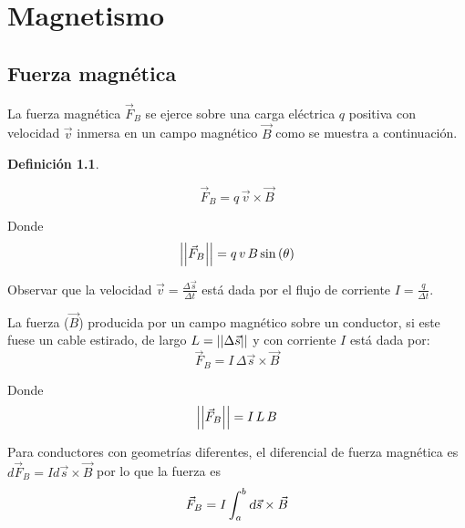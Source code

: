 \documentclass[a5paper,12pt,twoside]{book}
\newtheorem{defn}{{Definición}}[chapter]
\begin{document}
\chapter{Magnetismo}


\section{Fuerza magnética}

La fuerza magnética $\Vec{F}_B$ se ejerce sobre una carga eléctrica $q$ positiva con velocidad $\Vec{v}$ inmersa en un campo magnético $\Vec{B}$ como se muestra a continuación.

\begin{center}
    \def\svgwidth{0.5\linewidth}
    
\end{center}

\begin{mdframed}[style=MyFrame1]
    \begin{defn}
    \end{defn}
    \begin{equation*}
        \Vec{F}_B = q \, \Vec{v} \times \Vec{B}
    \end{equation*}
\end{mdframed}

Donde
\begin{equation*}
    {\left|\left| {\Vec{F}_B} \right|\right|} = q \, v \, B \sin\left(\theta\right)
\end{equation*}

Observar que la velocidad $\Vec{v} = \tfrac{\Delta \Vec{s}}{\Delta t}$ está dada por el flujo de corriente $I = \tfrac{q}{\Delta t}$.

La fuerza ($\Vec{B}$) producida por un campo magnético sobre un conductor, si este fuese un cable estirado, de largo $L = {\left|\left| {\Delta \Vec{s}} \right|\right|}$ y con corriente $I$ está dada por:
\begin{equation*}
    \Vec{F}_B = I \, \Delta \Vec{s} \times \Vec{B}
\end{equation*}

Donde
\begin{equation*}
    {\left|\left| {\Vec{F}_B} \right|\right|} = I \, L \, B
\end{equation*}

Para conductores con geometrías diferentes, el diferencial de fuerza magnética es $d \Vec{F}_B = I d\Vec{s} \times \Vec{B}$ por lo que la fuerza es
\begin{equation*}
    \Vec{F}_B = I \int_a^b \textsl{d} \Vec{s} \times \Vec{B}
\end{equation*}
\end{document}
